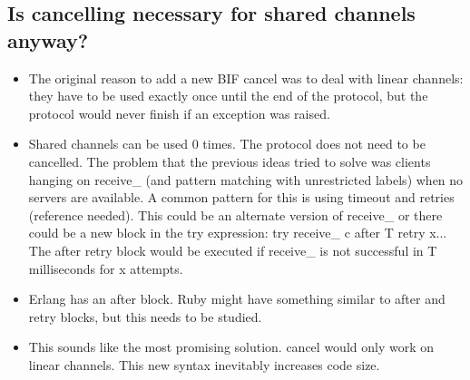 \documentclass[a4paper,11pt]{article}
\theoremstyle{plain}
\theoremstyle{nonumberplain}
\begin{document}
\subsection{Is cancelling necessary for shared channels anyway?}

\begin{itemize}
  \item The original reason to add a new BIF cancel was to deal with linear channels: they have to be used exactly once until the end of the protocol, but the protocol would never finish if an exception was raised.
  \item Shared channels can be used $0$ times. The protocol does not need to be cancelled. The problem that the previous ideas tried to solve was clients hanging on receive\_ (and pattern matching with unrestricted labels) when no servers are available. A common pattern for this is using timeout and retries (reference needed). This could be an alternate version of receive\_ or there could be a new block in the try expression: try receive\_ c after T retry x... The after retry block would be executed if receive\_ is not successful in T milliseconds for x attempts.
  \item Erlang has an after block. Ruby might have something similar to after and retry blocks, but this needs to be studied.
  \item This sounds like the most promising solution. cancel would only work on linear channels. This new syntax inevitably increases code size.
\end{itemize}
\end{document}
